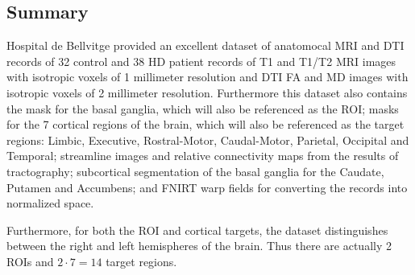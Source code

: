 \subsection{Summary}

Hospital de Bellvitge provided an excellent dataset of anatomocal \ac{MRI} and \ac{DTI} records of 32 control and 38 \ac{HD} patient records of T1 and T1/T2 \ac{MRI} images with isotropic voxels of 1 millimeter resolution and \ac{DTI} \ac{FA} and \ac{MD} images with isotropic voxels of 2 millimeter resolution. Furthermore this dataset also contains the mask for the basal ganglia, which will also be referenced as the \ac{ROI}; masks for the 7 cortical regions of the brain, which will also be referenced as the target regions: Limbic, Executive, Rostral-Motor, Caudal-Motor, Parietal, Occipital and Temporal; streamline images and relative connectivity maps from the results of tractography; subcortical segmentation of the basal ganglia for the Caudate, Putamen and Accumbens; and \ac{FNIRT} warp fields for converting the records into normalized space.\par
Furthermore, for both the \ac{ROI} and cortical targets, the dataset distinguishes between the right and left hemispheres of the brain. Thus there are actually 2 \ac{ROI}s and $2 \cdot 7=14$ target regions.

